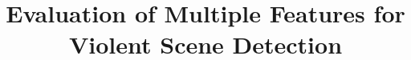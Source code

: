 \documentclass[twocolumn]{bmcart}%
\begin{document}
\begin{frontmatter}

\begin{fmbox}


\title{Evaluation of Multiple Features for \\
	Violent Scene Detection}


\author[
   addressref={aff1},                   %
   email={lqvu@fit.hcmus.edu.vn}   %
]{ }
\author[
   addressref={aff2},
   email={plsang@nii.ac.jp}
]{ }
\author[
addressref={aff2},
email={ledduy@nii.ac.jp}
]{ }
\author[
addressref={aff3},
email={ducda@uit.edu.vn}
]{ }
\author[
addressref={aff2},
email={satoh@nii.ac.jp}
]{ }



\end{fmbox}
\end{frontmatter}
\end{document}
